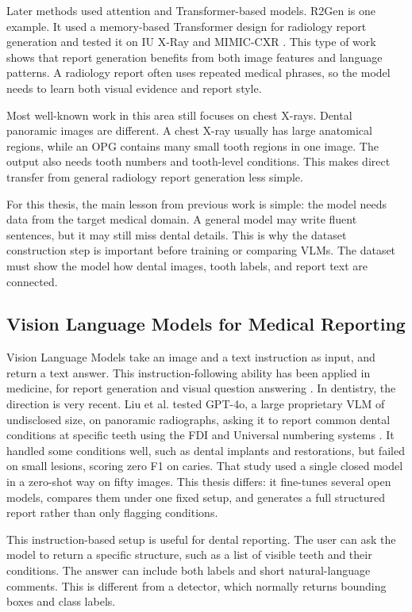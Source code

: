 \documentclass[a4paper,12pt]{report}
\begin{document}
Later methods used attention and Transformer-based models. R2Gen is one example. It used a memory-based Transformer design for radiology report generation and tested it on IU X-Ray and MIMIC-CXR \cite{chen2020r2gen}. This type of work shows that report generation benefits from both image features and language patterns. A radiology report often uses repeated medical phrases, so the model needs to learn both visual evidence and report style.

Most well-known work in this area still focuses on chest X-rays. Dental panoramic images are different. A chest X-ray usually has large anatomical regions, while an OPG contains many small tooth regions in one image. The output also needs tooth numbers and tooth-level conditions. This makes direct transfer from general radiology report generation less simple.

For this thesis, the main lesson from previous work is simple: the model needs data from the target medical domain. A general model may write fluent sentences, but it may still miss dental details. This is why the dataset construction step is important before training or comparing VLMs. The dataset must show the model how dental images, tooth labels, and report text are connected.
 
\subsection{Vision Language Models for Medical Reporting}
Vision Language Models take an image and a text instruction as input, and return a text answer. This instruction-following ability has been applied in medicine, for report generation and visual question answering \cite{hartsock2024vlmreview}. In dentistry, the direction is very recent. Liu et al. tested GPT-4o, a large proprietary VLM of undisclosed size, on panoramic radiographs, asking it to report common dental conditions at specific teeth using the FDI and Universal numbering systems \cite{liu2025dentalvlm}. It handled some conditions well, such as dental implants and restorations, but failed on small lesions, scoring zero F1 on caries. That study used a single closed model in a zero-shot way on fifty images. This thesis differs: it fine-tunes several open models, compares them under one fixed setup, and generates a full structured report rather than only flagging conditions.

This instruction-based setup is useful for dental reporting. The user can ask the model to return a specific structure, such as a list of visible teeth and their conditions. The answer can include both labels and short natural-language comments. This is different from a detector, which normally returns bounding boxes and class labels.
\end{document}
